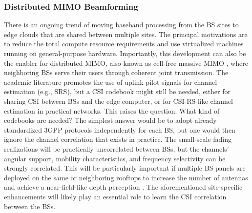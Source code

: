 \documentclass[lettersize,journal]{IEEEtran}
\begin{document}
\subsubsection{Distributed MIMO Beamforming}
There is an ongoing trend of moving baseband processing from the BS sites to edge clouds that are shared between multiple sites. The principal motivations are to reduce the total compute resource requirements and use virtualized machines running on general-purpose hardware. Importantly, this development can also be the enabler for distributed MIMO, also known as cell-free massive MIMO \cite{Nayebi2017a,Ngo2017b,cellfreebook}, where neighboring BSs serve their users through coherent joint transmission. The academic literature promotes the use of uplink pilot signals for channel estimation (e.g., SRS), but a CSI codebook might still be needed, either for sharing CSI between BSs and the edge computer, or for CSI-RS-like channel estimation in practical networks. This raises the question: What kind of codebooks are needed? The simplest answer would be to adopt already standardized 3GPP protocols independently for each BS, but one would then ignore the channel correlation that exists in practice. The small-scale fading realizations will be practically uncorrelated between BSs, but the channels’ angular support, mobility characteristics, and frequency selectivity can be strongly correlated. This will be particularly important if multiple BS panels are deployed on the same or neighboring rooftops to increase the number of antennas and achieve a near-field-like depth perception \cite{kosasih2025}. The aforementioned site-specific enhancements will likely play an essential role to learn the CSI correlation between the BSs.
\end{document}
